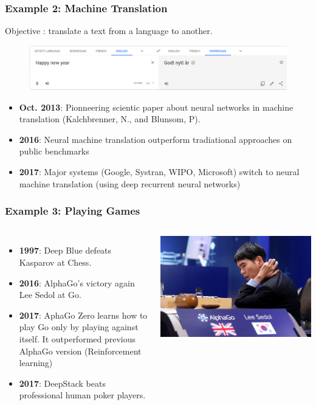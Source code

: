 \documentclass[handout]{beamer}
\begin{document}
\begin{frame}
\frametitle{Example 2: Machine Translation}
Objective : translate a text from a language to another.
\begin{figure}
\includegraphics[width=.8\textwidth]{./fig/L1/google-trad.png}
\end{figure}
\begin{itemize}
\item {\bf Oct. 2013}: Pionneering scientic paper about neural networks in machine translation (Kalchbrenner, N., and Blunsom, P).
\item {\bf 2016}: Neural machine translation outperform tradiational approaches on public benchmarks
\item {\bf 2017}: Major systems (Google, Systran, WIPO, Microsoft) switch to
  neural machine translation  (using deep recurrent neural networks)
\end{itemize}
\end{frame}


\begin{frame}
\frametitle{Example 3: Playing Games}
\begin{columns}
\begin{itemize}
\item {\bf 1997}: Deep Blue defeats Kasparov at Chess.
\item {\bf 2016}: AlphaGo's victory again Lee Sedol at Go.
\item {\bf 2017}: AphaGo Zero learns how to play Go only by playing against
  itself. It outperformed previous AlphaGo version (Reinforcement
  learning)
\item {\bf 2017}: DeepStack beats professional human poker players.
\end{itemize}
\includegraphics[width=\textwidth]{./fig/L1/alphago.jpg}
\end{columns}
\end{frame}
\end{document}
